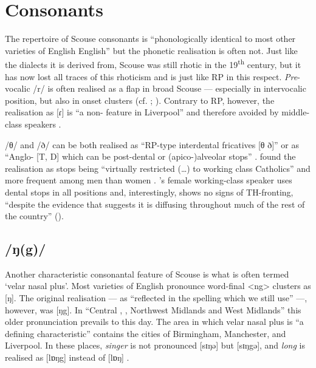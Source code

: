 	\section{Consonants}\label{sec.var.con}

The repertoire of Scouse consonants is ``phonologically identical to most other varieties of English English'' \citep[351]{watson2007} but the phonetic realisation is often not.
Just like the  dialects it is derived from, Scouse was still rhotic in the 19\textsuperscript{th} century, but it has now lost all traces of this rhoticism \citep[cf.][149]{knowles1997} and is just like RP in this respect.
\emph{Pre}-vocalic /r/ is often realised as a flap in broad Scouse --- especially in intervocalic position, but also in onset clusters (cf. \citealt[107 and 329--330]{knowles1973}; \citealt[352]{watson2007}).
Contrary to RP, however, the realisation as [ɾ] is ``a non- feature in Liverpool'' and therefore avoided by middle-class speakers \citep[329]{knowles1973}.

/θ/ and /ð/ can be both realised as ``RP-type interdental fricatives [θ ð]'' or as ``Anglo- [T, D] which can be post-dental or (apico-)alveolar stops'' \citep[323]{knowles1973}.
\citeauthor{knowles1973} found the realisation as stops being ``virtually restricted (\ldots) to working class Catholics'' and more frequent among men than women \citep[323--324]{knowles1973}.
\cite{watson2007}'s female working-class speaker uses dental stops in all positions and, interestingly, shows no signs of TH-fronting, ``despite the evidence that suggests it is diffusing throughout much of the rest of the country'' (\cite[cf.][352]{watson2007}).

		\subsection{/ŋ(g)/}\label{sec.var.con.ng}

Another characteristic consonantal feature of Scouse is what is often termed `velar nasal plus'.
Most varieties of English pronounce word-final <ng> clusters as [ŋ].
The original realisation --- as ``reflected in the spelling which we still use'' \citep[58]{trudgill1999} ---, however, was [ŋg]. In ``Central , , Northwest Midlands and West Midlands'' \citep[58]{trudgill1999} this older pronunciation prevails to this day. 
The area in which velar nasal plus is ``a defining characteristic'' \citep[58]{trudgill1999} contains the cities of Birmingham, Manchester, and Liverpool.
In these places, \emph{singer} is not pronounced [sɪŋə] but [sɪŋgə], and \emph{long} is realised as [lɒŋg] instead of [lɒŋ] \citep[cf.][58]{trudgill1999}.

